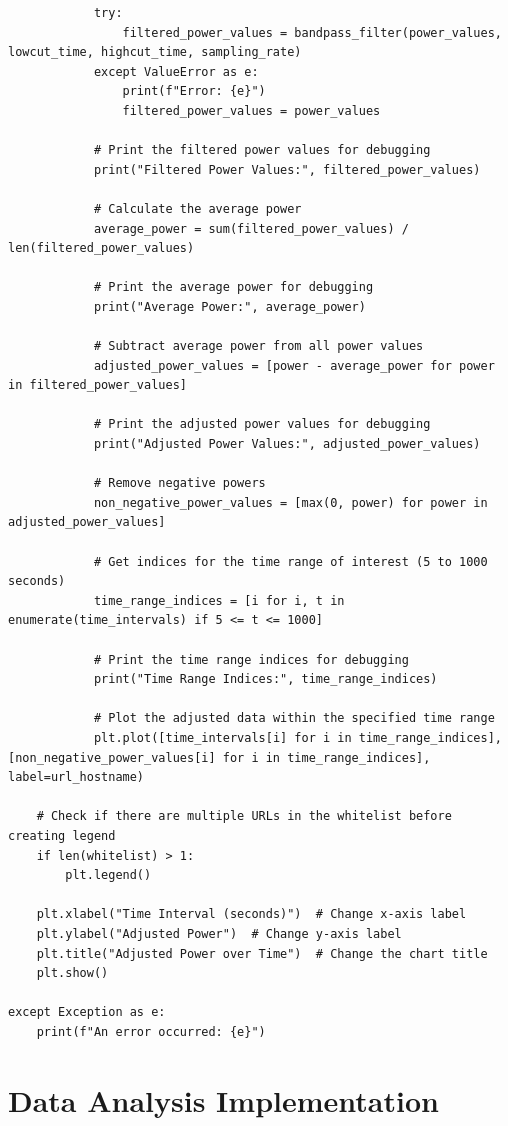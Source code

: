 \begin{lstlisting}
            try:
                filtered_power_values = bandpass_filter(power_values, lowcut_time, highcut_time, sampling_rate)
            except ValueError as e:
                print(f"Error: {e}")
                filtered_power_values = power_values

            # Print the filtered power values for debugging
            print("Filtered Power Values:", filtered_power_values)

            # Calculate the average power
            average_power = sum(filtered_power_values) / len(filtered_power_values)

            # Print the average power for debugging
            print("Average Power:", average_power)

            # Subtract average power from all power values
            adjusted_power_values = [power - average_power for power in filtered_power_values]

            # Print the adjusted power values for debugging
            print("Adjusted Power Values:", adjusted_power_values)

            # Remove negative powers
            non_negative_power_values = [max(0, power) for power in adjusted_power_values]

            # Get indices for the time range of interest (5 to 1000 seconds)
            time_range_indices = [i for i, t in enumerate(time_intervals) if 5 <= t <= 1000]

            # Print the time range indices for debugging
            print("Time Range Indices:", time_range_indices)

            # Plot the adjusted data within the specified time range
            plt.plot([time_intervals[i] for i in time_range_indices], [non_negative_power_values[i] for i in time_range_indices], label=url_hostname)

    # Check if there are multiple URLs in the whitelist before creating legend
    if len(whitelist) > 1:
        plt.legend()

    plt.xlabel("Time Interval (seconds)")  # Change x-axis label
    plt.ylabel("Adjusted Power")  # Change y-axis label
    plt.title("Adjusted Power over Time")  # Change the chart title
    plt.show()

except Exception as e:
    print(f"An error occurred: {e}")
\end{lstlisting}

\section{Data Analysis Implementation} %

